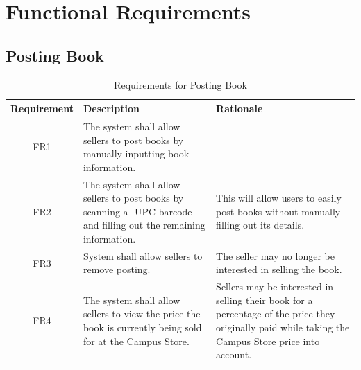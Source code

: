 \documentclass[fullpage]{article}
\begin{document}
\section{Functional Requirements}

\subsection{Posting Book}
\begin{table}[h!]
\flushleft
\begin{tabular}{|c|p{6cm}|p{6cm}|}
\hline
 \rowcolor{lightgray}
\textbf{Requirement} & \textbf{Description} & \textbf{Rationale} \\
\hline
FR1 &The system shall allow sellers to post books by manually inputting book information.& -\\
\hline
FR2&The system shall allow sellers to post books by scanning a -UPC barcode and filling out the remaining information. & This will allow users to easily post books without manually filling out its details.\\
\hline
FR3 & System shall allow sellers to remove posting.& The seller may no longer be interested in selling the book.\\
\hline
FR4 &  The system shall allow sellers to view the price the book is currently being sold for at the Campus Store. & Sellers may be interested in selling their book for a percentage of the price they originally paid while taking the Campus Store price into account.\\
\hline
\end{tabular}
\caption{Requirements for Posting Book}
\end{table}
\newpage
\end{document}
